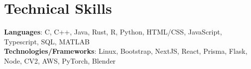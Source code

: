 \documentclass[letterpaper,11pt]{article}
\makeatletter
\newcommand{\resumeItem}[1]{
  \item\small{
    {#1 \vspace{-2pt}}
  }
}
\newcommand{\resumeSubheading}[4]{
  \vspace{-2pt}\item
    \begin{tabular*}{1.0\textwidth}[t]{l@{\extracolsep{\fill}}r}
      \small#1 & \textbf{\small #2} \\
      \textit{\small#3} & \textit{\small #4} \\
    \end{tabular*}\vspace{-9pt}
}
\newcommand{\resumeSubHeadingListStart}{\begin{itemize}[leftmargin=0.0in, label={}]}
\newcommand{\resumeSubHeadingListEnd}{\end{itemize}}
\newcommand{\resumeItemListStart}{\begin{itemize}}
\newcommand{\resumeItemListEnd}{\end{itemize}\vspace{-5pt}}
\makeatother
\begin{document}
\vspace{-17pt}
\section{Technical Skills}
 \begin{itemize}[leftmargin=0.15in, label={}]
    \small{\item{
     \textbf{Languages}{: C, C++, Java, Rust, R, Python, HTML/CSS, JavaScript, Typescript, SQL, MATLAB} \\
     \textbf{Technologies/Frameworks}{: Linux, Bootstrap, NextJS, React, Prisma, Flask, Node, CV2, AWS, PyTorch, Blender} \\
    }}
 \end{itemize}
\vspace{-20pt}


        
\end{document}
